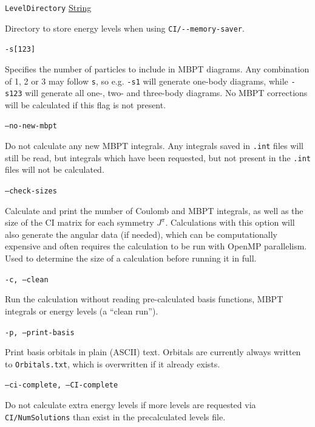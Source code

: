 \documentclass{report}
\begin{document}
\texttt{LevelDirectory} \uline{String}
\begin{adjustwidth}{1cm}{}
Directory to store energy levels when using \texttt{CI/{-}{-}memory-saver}.
\end{adjustwidth}

\texttt{-s[123]} 
\begin{adjustwidth}{1cm}{} 
Specifies the number of particles to include in MBPT diagrams. Any combination of 1, 2 or 3 may follow 
\texttt{s}, so e.g. \texttt{-s1} will generate one-body diagrams, while \texttt{-s123} will generate all 
one-, two- and three-body diagrams. No MBPT corrections will be calculated if this flag is not present.
\end{adjustwidth}

\texttt{--no-new-mbpt}
\begin{adjustwidth}{1cm}{} 
Do not calculate any new MBPT integrals. Any integrals saved in \texttt{.int} files will still be read, 
but integrals which have been requested, but not present in the \texttt{.int} files will not be
calculated.
\end{adjustwidth}

\texttt{--check-sizes}
\begin{adjustwidth}{1cm}{}
Calculate and print the number of Coulomb and MBPT integrals, as well as the size of the CI matrix for
each symmetry $J^{\pi}$. Calculations with this option will also generate the angular data (if needed),
which can be computationally expensive and often requires the calculation to be run with OpenMP
parallelism. Used to determine the size of a calculation before running it in full.
\end{adjustwidth}

\texttt{-c, --clean}
\begin{adjustwidth}{1cm}{}
Run the calculation without reading pre-calculated basis functions, MBPT integrals or energy levels (a
``clean run'').
\end{adjustwidth}

\texttt{-p, --print-basis}
\begin{adjustwidth}{1cm}{}
Print basis orbitals in plain (ASCII) text. Orbitals are currently always written to
\texttt{Orbitals.txt}, which is overwritten if it already exists.
\end{adjustwidth}

\texttt{--ci-complete, --CI-complete}
\begin{adjustwidth}{1cm}{}
Do not calculate extra energy levels if more levels are requested via \texttt{CI/NumSolutions} than
exist in the precalculated levels file.
\end{adjustwidth}
\end{document}
